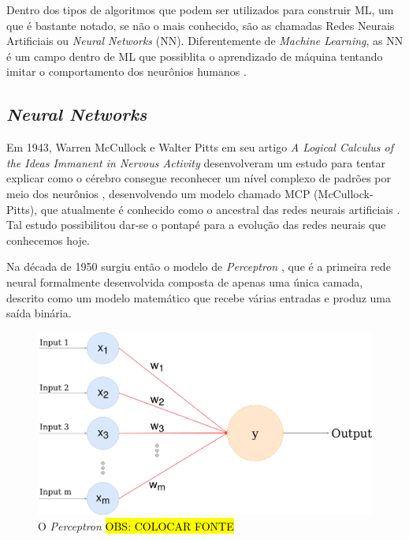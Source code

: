 Dentro dos tipos de algoritmos que podem ser utilizados para construir ML, um que é bastante notado, se não o mais conhecido, são as chamadas Redes Neurais Artificiais ou \textit{Neural Networks} (NN). Diferentemente de \textit{Machine Learning}, as NN é um campo dentro de ML que possiblita o aprendizado de máquina tentando imitar o comportamento dos neurônios humanos \cite{neural-net-history}.

\subsection{\textit{Neural Networks}}

Em 1943, Warren McCullock e Walter Pitts em seu artigo \textit{A Logical Calculus of the Ideas Immanent in Nervous Activity} desenvolveram um estudo para tentar explicar como o cérebro consegue reconhecer um nível complexo de padrões por meio dos neurônios \cite{first-neuron-study}, desenvolvendo um modelo chamado MCP (McCullock-Pitts), que atualmente é conhecido como o ancestral das redes neurais artificiais \cite{dl-brief-review}. Tal estudo possibilitou dar-se o pontapé para a evolução das redes neurais que conhecemos hoje.

Na década de 1950 surgiu então o modelo de \textit{Perceptron} \cite{perceptron}, que é a primeira rede neural formalmente desenvolvida composta de apenas uma única camada, descrito como um modelo matemático que recebe várias entradas e produz uma saída binária.


\begin{figure}[h]
  \includegraphics[width=13cm, center]{figuras/perceptron}
  \caption{O \textit{Perceptron} \hl{OBS: COLOCAR FONTE}}
  \label{fig:perceptron}
\end{figure}

